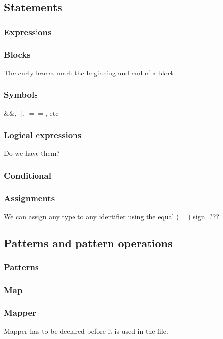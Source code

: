 \documentclass[11pt,twoside]{article}
\begin{document}
\subsection{Statements}

\subsubsection{Expressions}


\subsubsection{Blocks}
The curly braces mark the beginning and end of a block.

\subsubsection{Symbols}
$\&\&$, $||$, $==$, etc


\subsubsection{Logical expressions}
Do we have them?


\subsubsection{Conditional}


\subsubsection{Assignments}
We can assign any type to any identifier using the equal ($=$) sign.
???

\subsection{Patterns and pattern operations}

\subsubsection{Patterns}

\subsubsection{Map}

\subsubsection{Mapper}
Mapper has to be declared before it is used in the file.
\end{document}
